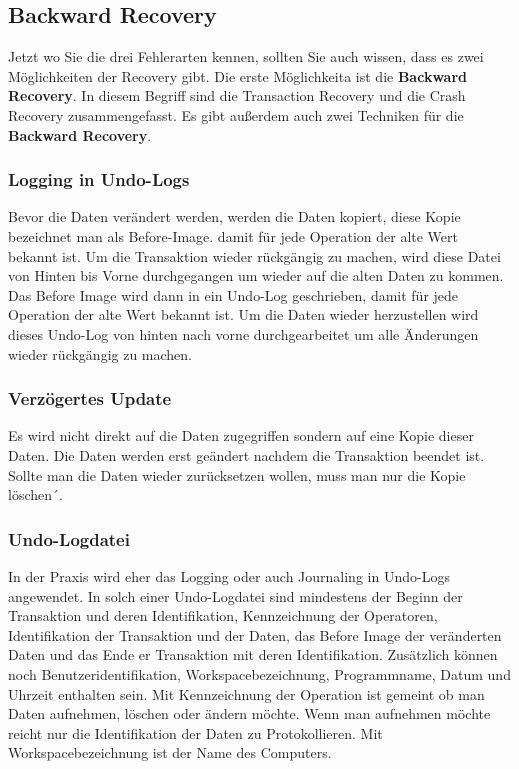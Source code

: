 \begin{flushleft}
\subsection{Backward Recovery} 

Jetzt wo Sie die drei Fehlerarten kennen, sollten Sie auch wissen, dass es zwei Möglichkeiten der Recovery gibt. Die erste Möglichkeita ist die \textbf{Backward Recovery}. In diesem Begriff sind die Transaction Recovery und die Crash Recovery zusammengefasst. 
Es gibt außerdem auch zwei Techniken für die \textbf{Backward Recovery}.

\subsubsection{Logging in Undo-Logs}

Bevor die Daten verändert werden, werden die Daten kopiert, diese Kopie bezeichnet man als Before-Image.  damit für jede Operation der alte Wert bekannt ist. Um die Transaktion wieder rückgängig zu machen, wird diese Datei von Hinten bis Vorne durchgegangen um wieder auf die alten Daten zu kommen. Das Before Image wird dann in ein Undo-Log geschrieben, damit für jede Operation der alte Wert bekannt ist. Um die Daten wieder herzustellen wird dieses Undo-Log von hinten nach vorne durchgearbeitet um alle Änderungen wieder rückgängig zu machen.

\subsubsection{Verzögertes Update}

Es wird nicht direkt auf die Daten zugegriffen sondern auf eine Kopie dieser Daten. Die Daten werden erst geändert nachdem die Transaktion beendet ist. Sollte man die Daten wieder zurücksetzen wollen, muss man nur die Kopie löschen´.

\subsubsection{Undo-Logdatei}

In der Praxis wird eher das Logging oder auch Journaling in Undo-Logs angewendet. 
In solch einer Undo-Logdatei sind mindestens der Beginn der Transaktion und deren Identifikation, Kennzeichnung der Operatoren, Identifikation der Transaktion und der Daten, das Before Image der veränderten Daten und das Ende er Transaktion mit deren Identifikation. Zusätzlich können noch Benutzeridentifikation, Workspacebezeichnung, Programmname, Datum und Uhrzeit enthalten sein. 
Mit Kennzeichnung der Operation ist gemeint ob man Daten aufnehmen, löschen oder ändern möchte. Wenn man aufnehmen möchte reicht nur die Identifikation der Daten zu Protokollieren. Mit Workspacebezeichnung ist der Name des Computers.


\end{flushleft}
